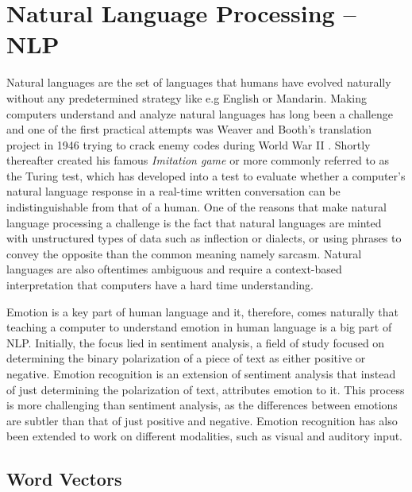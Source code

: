 \documentclass[nofilelist]{cslthse-msc}
\begin{document}
\section{Natural Language Processing -- NLP}
Natural languages are the set of languages that humans have evolved naturally without any predetermined strategy like e.g English or Mandarin. Making computers understand and analyze natural languages has long been a challenge and one of the first practical attempts was Weaver and Booth's translation project in 1946 trying to crack enemy codes during World War II \citep{Liddy2001NLP}. Shortly thereafter \citet{Turing1950} created his famous \textit{Imitation game} or more commonly referred to as the Turing test, which has developed into a test to evaluate whether a computer's natural language response in a real-time written conversation can be indistinguishable from that of a human. One of the reasons that make natural language processing a challenge is the fact that natural languages are minted with unstructured types of data such as inflection or dialects, or using phrases to convey the opposite than the common meaning namely sarcasm. Natural languages are also oftentimes ambiguous and require a context-based interpretation that computers have a hard time understanding. 


Emotion is a key part of human language and it, therefore, comes naturally that teaching a computer to understand emotion in human language is a big part of NLP. Initially, the focus lied in sentiment analysis, a field of study focused on determining the binary polarization of a piece of text as either positive or negative. 
Emotion recognition is an extension of sentiment analysis that instead of just determining the polarization of text, attributes emotion to it. This process is more challenging than sentiment analysis, as the differences between emotions are subtler than that of just positive and negative. 
Emotion recognition has also been extended to work on different modalities, such as visual and auditory input.




\subsection{Word Vectors}
\end{document}
